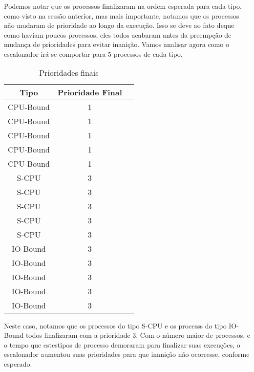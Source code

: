 \documentclass{article}
\begin{document}
Podemos notar que os processos finalizaram na ordem esperada para cada tipo,
como visto na sessão anterior, mas mais importante, notamos que os processos
não mudaram de prioridade ao longo da execução. Isso se deve ao fato deque como
haviam poucos processos, eles todos acabaram antes da preempção de mudança de
prioridades para evitar inanição. Vamos analisar agora como o escalonador irá
se comportar para 5 processos de cada tipo.

\begin{table}[H]
      \centering
      \begin{tabular}{|c|c|c|}
            \hline
            \textbf{Tipo} & \textbf{Prioridade Final} \\
            \hline
            CPU-Bound     & 1                         \\
            CPU-Bound     & 1                         \\
            CPU-Bound     & 1                         \\
            CPU-Bound     & 1                         \\
            CPU-Bound     & 1                         \\
            S-CPU         & 3                         \\
            S-CPU         & 3                         \\
            S-CPU         & 3                         \\
            S-CPU         & 3                         \\
            S-CPU         & 3                         \\
            IO-Bound      & 3                         \\
            IO-Bound      & 3                         \\
            IO-Bound      & 3                         \\
            IO-Bound      & 3                         \\
            IO-Bound      & 3                         \\
            \hline
      \end{tabular}
      \caption{Prioridades finais}
\end{table}

Neste caso, notamos que os processos do tipo S-CPU e os processs do tipo
IO-Bound todos finalizaram com a prioridade 3. Com o número maior de processos,
e o tempo que estestipos de processo demoraram para finalizar suas execuções, o
escalonador aumentou suas prioridades para que inanição não ocorresse, conforme
esperado.
\end{document}
